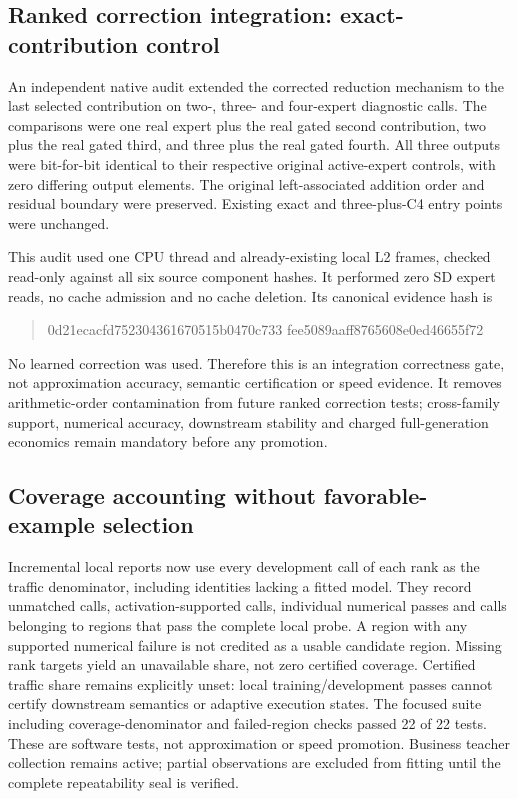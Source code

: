 \subsection{Ranked correction integration: exact-contribution control}
An independent native audit extended the corrected reduction mechanism to
the last selected contribution on two-, three- and four-expert diagnostic
calls. The comparisons were one real expert plus the real gated second
contribution, two plus the real gated third, and three plus the real gated
fourth. All three outputs were bit-for-bit identical to their respective
original active-expert controls, with zero differing output elements.
The original left-associated addition order and residual boundary were
preserved. Existing exact and three-plus-C4 entry points were unchanged.

This audit used one CPU thread and already-existing local L2 frames, checked
read-only against all six source component hashes. It performed zero SD expert
reads, no cache admission and no cache deletion. Its canonical evidence hash is
\begin{quote}\ttfamily\small
0d21ecacfd752304361670515b0470c733\allowbreak
fee5089aaff8765608e0ed46655f72
\end{quote}
No learned correction was used. Therefore this is an integration correctness
gate, not approximation accuracy, semantic certification or speed evidence.
It removes arithmetic-order contamination from future ranked correction tests;
cross-family support, numerical accuracy, downstream stability and charged
full-generation economics remain mandatory before any promotion.

\subsection{Coverage accounting without favorable-example selection}
Incremental local reports now use every development call of each rank as the
traffic denominator, including identities lacking a fitted model. They record
unmatched calls, activation-supported calls, individual numerical passes and
calls belonging to regions that pass the complete local probe. A region with
any supported numerical failure is not credited as a usable candidate region.
Missing rank targets yield an unavailable share, not zero certified coverage.
Certified traffic share remains explicitly unset: local training/development
passes cannot certify downstream semantics or adaptive execution states.
The focused suite including coverage-denominator and failed-region checks
passed 22 of 22 tests. These are software tests, not approximation or speed
promotion. Business teacher collection remains active; partial observations
are excluded from fitting until the complete repeatability seal is verified.
